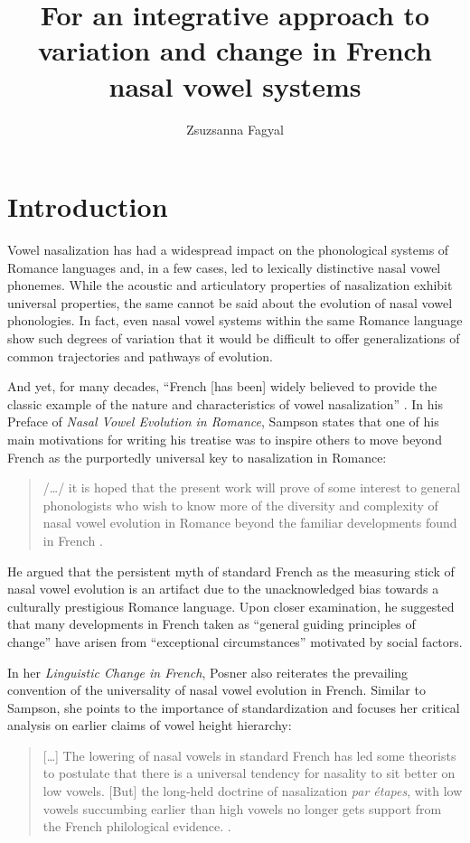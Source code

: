 \documentclass[output=paper,colorlinks,citecolor=brown]{langscibook}
\author{Zsuzsanna Fagyal\affiliation{University of Illinois Urbana-Champaign}}
\title[Integrative approach to variation and change in French nasal vowel systems]{For an integrative approach to variation and change in French nasal vowel systems}
\begin{document}
\maketitle

\section{Introduction}
Vowel nasalization has had a widespread impact on the phonological systems of Romance languages and, in a few cases, led to lexically distinctive nasal vowel phonemes. While the acoustic and articulatory properties of nasalization exhibit universal properties, the same cannot be said about the evolution of nasal vowel phonologies. In fact, even nasal vowel systems within the same Romance language show such degrees of variation that it would be difficult to offer generalizations of common trajectories and pathways of evolution.

And yet, for many decades, “French [has been] widely believed to provide the classic example of the nature and characteristics of vowel nasalization” \citep[][1]{Sampson1999}. In his Preface of \textit{Nasal Vowel Evolution in Romance}, Sampson states that one of his main motivations for writing his treatise was to inspire others to move beyond French as the purportedly universal key to nasalization in Romance:
\begin{quote}
/…/ it is hoped that the present work will prove of some interest to general phonologists who wish to know more of the diversity and complexity of nasal vowel evolution in Romance beyond the familiar developments found in French \citep[][v]{Sampson1999}.
\end{quote}

He argued that the persistent myth of standard French as the measuring stick of nasal vowel evolution is an artifact due to the unacknowledged bias towards a culturally prestigious Romance language. Upon closer examination, he suggested that many developments in French taken as “general guiding principles of change” have arisen from “exceptional circumstances” motivated by social factors.

In her \textit{Linguistic Change in French}, Posner also reiterates the prevailing convention of the universality of nasal vowel evolution in French. Similar to Sampson, she points to the importance of standardization and focuses her critical analysis on earlier claims of vowel height hierarchy:
\begin{quote}
    […] The lowering of nasal vowels in standard French has led some theorists to postulate that there is a universal tendency for nasality to sit better on low vowels. [But] the long-held doctrine of nasalization \textit{par étapes}, with low vowels succumbing earlier than high vowels no longer gets support from the French philological evidence. \citep[][235--236]{Posner1997}.
\end{quote}
\end{document}
